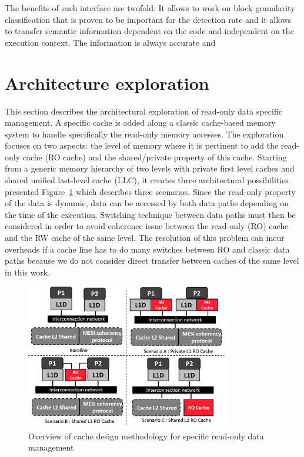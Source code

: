 \documentclass[sigconf]{acmart}
\begin{document}
The benefits of such interface are twofold: It allows to work on block granularity classification that is proven to be important for the detection rate and it allows to transfer semantic information dependent on the code and independent on the execution context. The information is always accurate and 

\section{Architecture exploration}

This section describes the architectural exploration of read-only data
specific management. A specific cache is added along a classic
cache-based memory system to handle specifically the read-only memory
accesses. The exploration focuses on two aspects: the level of memory
where it is pertinent to add the read-only cache (RO cache) and the
shared/private property of this cache. Starting from a generic memory
hierarchy of two levels with private first level caches and shared
unified last-level cache (LLC), it creates three architectural
possibilities presented Figure~\ref{architecture} which describes
three scenarios. Since the read-only property of the data is dynamic,
data can be accessed by both data paths depending on the time of the
execution. Switching technique between data paths must then be
considered in order to avoid coherence issue between the read-only
(RO) cache and the RW cache of the same level. The resolution of this
problem can incur overheads if a cache line has to do many switches
between  RO and  classic data paths because we do not consider
direct transfer between caches of the same level in this work.


\begin{figure}
    \centering
    \includegraphics[width=9cm]{./images/architecture.png}
    \caption{Overview of cache design methodology for specific read-only data management}
    \label{architecture}
\end{figure}
\end{document}
